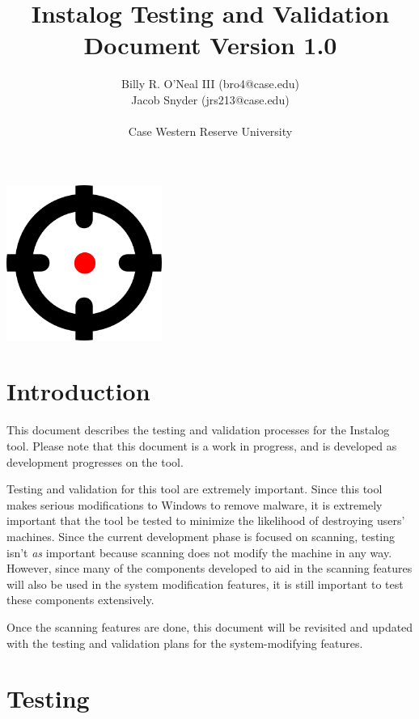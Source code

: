 \documentclass[letterpaper,12pt]{article}
\title{Instalog Testing and Validation \\ Document Version 1.0}
\author{
Billy R. O'Neal III (bro4@case.edu) \\
Jacob Snyder (jrs213@case.edu) \\ \\
Case Western Reserve University
}
\begin{document}
\maketitle
\vspace{1in}
\begin{center}
\includegraphics[width=2in, height=2in]{figures/InstalogLogo.png}
\end{center}
\newpage



\tableofcontents
\newpage



\section{Introduction}
This document describes the testing and validation processes for the Instalog
tool.  Please note that this document is a work in progress, and is developed as
development progresses on the tool.  

Testing and validation for this tool are extremely important.  Since this tool
makes serious modifications to Windows to remove malware, it is extremely
important that the tool be tested to minimize the likelihood of destroying
users' machines.  Since the current development phase is focused on scanning,
testing isn't \textit{as} important because scanning does not modify the machine
in any way.  However, since many of the components developed to aid in the
scanning features will also be used in the system modification features, it is
still important to test these components extensively.

Once the scanning features are done, this document will be revisited and updated
with the testing and validation plans for the system-modifying features.

\newpage



\section{Testing} \label{testing}
\end{document}
